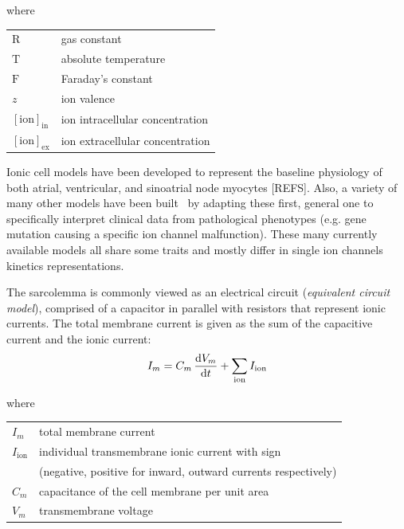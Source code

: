 \noindent
where

\vspace{0.2cm}
\begin{tabular}{ll}
    $\textrm{R}$  & gas constant \\
    $\textrm{T}$  & absolute temperature \\
    $\textrm{F}$  & Faraday's constant \\
    $z$           & ion valence \\
    $[\textrm{ion}]_{\textrm{in}}$  & ion intracellular concentration \\
    $[\textrm{ion}]_{\textrm{ex}}$  & ion extracellular concentration \\
\end{tabular}

\vspace{0.5cm}
Ionic cell models have been developed to represent the baseline physiology of both atrial, ventricular, and sinoatrial node myocytes [REFS]. Also, a variety of many other models have been built~\cite{Corrado:2020} by adapting these first, general one to specifically interpret clinical data from pathological phenotypes (e.g. gene mutation causing a specific ion channel malfunction). These many currently available models all share some traits and mostly differ in single ion channels kinetics representations.

\vspace{0.2cm}
The sarcolemma is commonly viewed as an electrical circuit (\textit{equivalent circuit model}), comprised of a capacitor in parallel with resistors that represent ionic currents. The total membrane current is given as the sum of the capacitive current and the ionic current:
%
\begin{equation}
I_m = C_m\,\dfrac{\mathrm{d}{V_m}}{\mathrm{d}{t}} + \sum_{\textrm{ion}}I_\textrm{ion}
\end{equation}

\noindent
where

\vspace{0.2cm}
\begin{tabular}{ll}
    $I_m$            & total membrane current \\
    $I_\textrm{ion}$ & individual transmembrane ionic current with sign \\ & (negative, positive for inward, outward currents respectively) \\ 
    $C_m$            & capacitance of the cell membrane per unit area \\
    $V_m$            & transmembrane voltage
\end{tabular}

